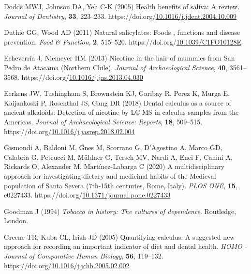 \documentclass[
  11pt,
  leqno]{scrartcl}
\newlength{\cslhangindent}
\newenvironment{CSLReferences}[2] %
 {\begin{list}{}{%
  \setlength{\itemindent}{0pt}
  \setlength{\leftmargin}{0pt}
  \setlength{\parsep}{0pt}
  \ifodd #1
   \setlength{\leftmargin}{\cslhangindent}
   \setlength{\itemindent}{-1\cslhangindent}
  \fi
  \setlength{\itemsep}{#2\baselineskip}}}
 {\end{list}}
\begin{document}
\begin{CSLReferences}{1}{0}
Dodds MWJ, Johnson DA, Yeh C-K (2005) Health benefits of saliva: A
review. \emph{Journal of Dentistry}, \textbf{33}, 223--233.
https://doi.org/\href{https://doi.org/10.1016/j.jdent.2004.10.009}{10.1016/j.jdent.2004.10.009}

Duthie GG, Wood AD (2011) Natural salicylates: Foods , functions and
disease prevention. \emph{Food \& Function}, \textbf{2}, 515--520.
https://doi.org/\href{https://doi.org/10.1039/C1FO10128E}{10.1039/C1FO10128E}

Echeverría J, Niemeyer HM (2013) Nicotine in the hair of mummies from
{San Pedro} de {Atacama} ({Northern Chile}). \emph{Journal of
Archaeological Science}, \textbf{40}, 3561--3568.
https://doi.org/\href{https://doi.org/10.1016/j.jas.2013.04.030}{10.1016/j.jas.2013.04.030}

Eerkens JW, Tushingham S, Brownstein KJ, Garibay R, Perez K, Murga E,
Kaijankoski P, Rosenthal JS, Gang DR (2018) Dental calculus as a source
of ancient alkaloids: {Detection} of nicotine by {LC-MS} in calculus
samples from the {Americas}. \emph{Journal of Archaeological Science:
Reports}, \textbf{18}, 509--515.
https://doi.org/\href{https://doi.org/10.1016/j.jasrep.2018.02.004}{10.1016/j.jasrep.2018.02.004}

Gismondi A, Baldoni M, Gnes M, Scorrano G, D'Agostino A, Marco GD,
Calabria G, Petrucci M, Müldner G, Tersch MV, Nardi A, Enei F, Canini A,
Rickards O, Alexander M, Martínez-Labarga C (2020) A multidisciplinary
approach for investigating dietary and medicinal habits of the
{Medieval} population of {Santa Severa} (7th-15th centuries, {Rome},
{Italy}). \emph{PLOS ONE}, \textbf{15}, e0227433.
https://doi.org/\href{https://doi.org/10.1371/journal.pone.0227433}{10.1371/journal.pone.0227433}

Goodman J (1994) \emph{Tobacco in history: The cultures of dependence}.
{Routledge}, {London}.

Greene TR, Kuba CL, Irish JD (2005) Quantifying calculus: {A} suggested
new approach for recording an important indicator of diet and dental
health. \emph{HOMO - Journal of Comparative Human Biology}, \textbf{56},
119--132.
https://doi.org/\href{https://doi.org/10.1016/j.jchb.2005.02.002}{10.1016/j.jchb.2005.02.002}


\end{CSLReferences}
\end{document}
